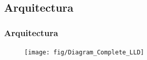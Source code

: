 \subsection{Arquitectura}
\begin{frame}[shrink]
  \frametitle{Arquitectura}
  \begin{figure}
    \texttt{[image: fig/Diagram\_Complete\_LLD]}
  \end{figure}
\end{frame}

